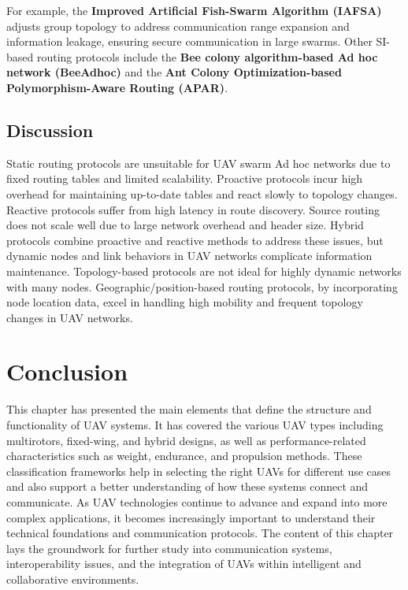 For example, the \textbf{Improved Artificial Fish-Swarm Algorithm (IAFSA)} adjusts group topology to address communication range expansion and information leakage, ensuring secure communication in large swarms. Other SI-based routing protocols include the \textbf{Bee colony algorithm-based Ad hoc network (BeeAdhoc)} and the \textbf{Ant Colony Optimization-based Polymorphism-Aware Routing (APAR)}.


\subsection{Discussion}

Static routing protocols are unsuitable for UAV swarm Ad hoc networks due to fixed routing tables and limited scalability. Proactive protocols incur high overhead for maintaining up-to-date tables and react slowly to topology changes. Reactive protocols suffer from high latency in route discovery. Source routing does not scale well due to large network overhead and header size. Hybrid protocols combine proactive and reactive methods to address these issues, but dynamic nodes and link behaviors in UAV networks complicate information maintenance. Topology-based protocols are not ideal for highly dynamic networks with many nodes. Geographic/position-based routing protocols, by incorporating node location data, excel in handling high mobility and frequent topology changes in UAV networks.






\section{Conclusion}


This chapter has presented the main elements that define the structure and functionality of UAV systems. It has covered the various UAV types including multirotors, fixed-wing, and hybrid designs, as well as performance-related characteristics such as weight, endurance, and propulsion methods. These classification frameworks help in selecting the right UAVs for different use cases and also support a better understanding of how these systems connect and communicate. As UAV technologies continue to advance and expand into more complex applications, it becomes increasingly important to understand their technical foundations and communication protocols. The content of this chapter lays the groundwork for further study into communication systems, interoperability issues, and the integration of UAVs within intelligent and collaborative environments.